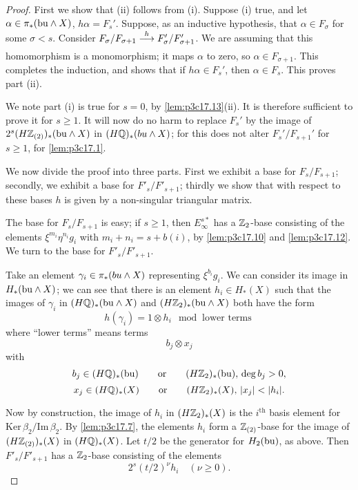 \documentclass[../main]{subfiles}
\begin{document}
\begin{proof}
First we show that (ii) follows from (i). Suppose (i) true, and let $\alpha \in \pi_\ast(\mathrm{bu} \wedge X)$, $h\alpha = F_s'$. Suppose, as an inductive hypothesis, that $\alpha \in F_\sigma$ for some $\sigma < s$. Consider $F_\sigma/F_{\sigma + 1} \lar{h} F_\sigma'/F_{\sigma + 1}'$. We are assuming that this homomorphism is a monomorphism; it maps $\alpha$ to zero, so $\alpha \in F_{\sigma + 1}$. This completes the induction, and shows that if $h \alpha \in F_s'$, then $\alpha \in F_s$. This proves part (ii).

We note part (i) is true for $s = 0$, by \ref{lem:p3c17.13}(ii). It is therefore sufficient to prove it for $s \ge 1$. It will now do no harm to replace $F_s'$ by the image of $2^s(H\mathbb{Z}_{(2)})_\ast(\mathrm{bu} \wedge X)$ in $(H\bbQ)_\ast(\mathrm \te{bu} \wedge X)$; for this does not alter $F_s'/F_{s + 1}'$ for $s \ge 1$, for \ref{lem:p3c17.1}.

We now divide the proof into three parts. First we exhibit a base for $F_s/F_{s + 1}$; secondly, we exhibit a base for $F'_s/F'_{s + 1}$; thirdly we show that with respect to these bases $h$ is given by a non-singular triangular matrix.

The base for $F_s/F_{s + 1}$ is easy; if $s \ge 1$, then $E_\infty^{s\ast}$ has a $\mathbb{Z}_2$-base consisting of the elements $\xi^{m_i} \eta^{n_i} g_i$ with $m_i + n_i = s + b(i)$, by \ref{lem:p3c17.10} and \ref{lem:p3c17.12}. We turn to the base for $F'_s/F'_{s + 1}$. 

Take an element $\gamma_i \in \pi_\ast(\mathrm \te{bu} \wedge X)$ representing $\xi^{b_i} g_i$. We can consider its image in $H_\ast(\mathrm{bu} \wedge X)$; we can see that there is an element $h_i \in H_\ast(X)$ such that the images of $\gamma_i$ in $(H \mathbb{Q})_\ast(\mathrm{bu} \wedge X)$ and $(H\mathbb{Z}_2)_\ast(\mathrm{bu} \wedge X)$ both have the form \[h(\gamma_i) = 1 \otimes h_i \mod \text{ lower terms}\] where ``lower terms'' means terms \[b_j \otimes x_j\] with \[b_j \in (H \mathbb{Q})_\ast(\mathrm{bu}) \qquad \text {or} \qquad (H \mathbb{Z}_2)_\ast(\mathrm{bu}), \, \deg b_j > 0,\] \[x_j \in (H \mathbb{Q})_\ast(X) \qquad \text{or} \qquad (H \mathbb{Z}_2)_\ast(X), \, |x_j| < |h_i|.\]

Now by construction, the image of $h_i$ in $(H\mathbb{Z}_2)_\ast(X)$ is the $i^{\mathrm{th}}$ basis element for $\mathrm{Ker} \, \beta_2/\mathrm{Im} \, \beta_2$. By \ref{lem:p3c17.7}, the elements $h_i$ form a $\mathbb{Z}_{(2)}$-base for the image of $(H \mathbb{Z}_{(2)})_\ast(X)$ in $(H\mathbb{Q})_\ast(X)$. Let $t/2$ be the generator for $H_2(\mathrm{bu})$, as above. Then $F'_s/F'_{s + 1}$ has a $\mathbb{Z}_2$-base consisting of the elements \[2^s(t/2)^\nu h_i \quad (\nu \ge 0).\] 


\end{proof}
\end{document}
